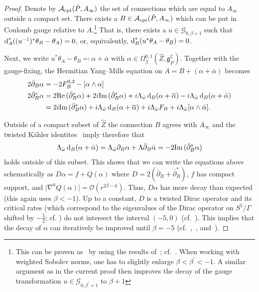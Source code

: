 \documentclass[11pt,a4paper]{scrartcl}
\newcommand*\diff{\mathop{}\!\textup{d}}
\newcommand{\im}{\textup{Im}\thinspace }
\renewcommand{\Im}{\textup{Im}\thinspace}
\renewcommand{\Re}{\textup{Re}\thinspace}
\numberwithin{equation}{section}
\theoremstyle{plain}
\theoremstyle{definition}
\theoremstyle{remark}
\begin{document}
\begin{proof}
Denote by $\mathcal{A}_{\textup{cpt}}(\hat{P},A_\infty)$ the set of connections which are equal to $A_\infty$ outside a compact set. There exists a $B \in \mathcal{A}_{\textup{cpt}}(\hat{P},A_\infty)$ which can be put in Coulomb gauge relative to $A$.\footnote{This can be proven as~\cite[Theorem~3.2]{FreedUhlenbeck-Instantons} by using the results of~\cite[Section~1 and~2]{Bartnik-MassofALF}; cf.~\cite[Proposition~2.3]{Nakajima-ASDonALE}. When working with weighted Sobolev norms, one has to slightly enlarge $\beta < \beta^\prime<-1$. A similar argument as in the current proof then improves the decay of the gauge transformation $u\in \mathcal{G}_{0,\beta^\prime+1}$ to $\beta+1$} That is, there exists a $u\in \mathcal{G}_{0,\beta+1}$ such that $\diff_A^*((u^{-1})^*\theta_B-\theta_A)=0$, or, equivalently, $\diff_B^*(u^*\theta_A-\theta_B)=0$. 

Next, we write $u^*\theta_A -\theta_B \eqqcolon \alpha+\bar{\alpha}$ with $\alpha\in \Omega^{0,1}_\beta(\hat{Z},\mathfrak{g}_{\hat{P}}^\mathbb{C})$. Together with the gauge-fixing, the Hermitian Yang--Mills equation on $A = B + (\alpha +\bar{\alpha})$ becomes
\begin{align*}
2\bar{\partial}_B\alpha &= -2F_B^{0,2}-[\alpha\wedge\alpha]\\
2\bar{\partial}_B^* \alpha &= 2\Re(\bar{\partial}_B^* \alpha) + 2i \im(\bar{\partial}^*_B \alpha) + i \Lambda_{\hat{\omega}} \diff_B(\alpha+\overline{\alpha}) - i \Lambda_{\hat{\omega}} \diff_B(\alpha +\bar{\alpha}) \\ &= 2i \im(\bar{\partial}^*_B\alpha) + i \Lambda_{\hat{\omega}} \diff_B(\alpha+\overline{\alpha}) +  i\Lambda_{\hat{\omega}} F_B + i\Lambda_{\hat{\omega}} [\alpha\wedge \bar{\alpha}].
\end{align*}

Outside of a compact subset of $\hat{Z}$ the connection $B$ agrees with $A_\infty$ and the twisted Kähler identites~\cite[Lemma~5.2.3]{Huybrechts-Complex} imply therefore that \[ \Lambda_{\hat{\omega}} \diff_B (\alpha + \bar{\alpha}) = \Lambda_{\hat{\omega}} \partial_B \alpha + \Lambda \bar{\partial}_B \bar{\alpha} = -2 \Im(\bar{\partial}^*_B \alpha) \] holds outside of this subset. This shows that we can write the equations above schematically as $D \alpha = f + Q(\alpha)$ where $D= 2(\bar{\partial}_B+\bar{\partial}_B^*)$, $f$ has compact support, and $\vert \nabla^k Q(\alpha)\vert = \mathcal{O}(r^{2\beta-k})$. Thus, $D\alpha$ has more decay than expected (this again uses $\beta<-1$). Up to a constant, $D$ is a twisted Dirac operator and its critical rates (which correspond to the eigenvalues of the Dirac operator on $S^5/\Gamma$ shifted by $-\frac{5}{2}$; cf. \cite[Proof of Theorem~6.1]{WalpuskiDegeratu-HYM_on_crepant_resolutions}) do not intersect the interval $(-5,0)$ (cf.~\cite[Proposition~6.1]{Bartnik-MassofALF}). This implies that the decay of $\alpha$ can iteratively be improved until $\beta = -5$ (cf.~\cite[Theorem~1.14]{Bartnik-MassofALF},~\cite[Theorem~1.17]{Bartnik-MassofALF}, and~\cite[Section~I.5]{LockhartMcOwen-ellipticOperators_nonCompactMfds}).
\end{proof}
\end{document}
